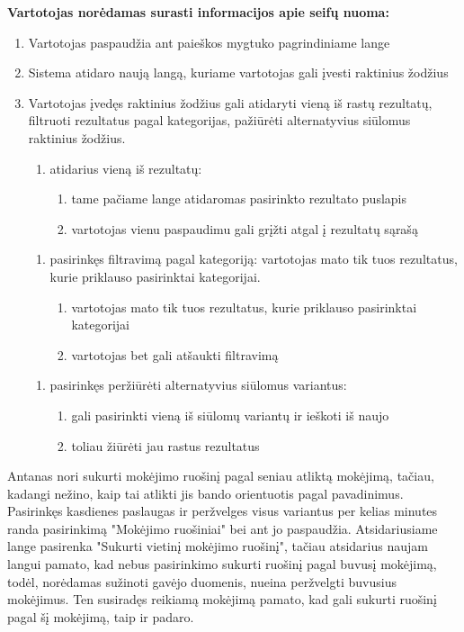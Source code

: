 \documentclass{VUMIFPSkursinis}
\begin{document}
\begin{center}
	\textbf{Vartotojas norėdamas surasti informacijos apie seifų nuoma:}
\end{center}
\begin{enumerate}
	\item Vartotojas paspaudžia ant paieškos mygtuko pagrindiniame lange
	\item Sistema atidaro naują langą, kuriame vartotojas gali įvesti raktinius žodžius
	\item Vartotojas įvedęs raktinius žodžius gali atidaryti vieną iš rastų rezultatų, filtruoti rezultatus pagal kategorijas, pažiūrėti alternatyvius siūlomus raktinius žodžius.
	\begin{enumerate}
		\item atidarius vieną iš rezultatų:
		\begin{enumerate}
			\item tame pačiame lange atidaromas pasirinkto rezultato puslapis
			\item vartotojas vienu paspaudimu gali grįžti atgal į rezultatų sąrašą
		\end{enumerate}
	\end{enumerate}
	\begin{enumerate}
		\item pasirinkęs filtravimą pagal kategoriją: vartotojas mato tik tuos rezultatus, kurie priklauso pasirinktai kategorijai.
		\begin{enumerate}
			\item vartotojas mato tik tuos rezultatus, kurie priklauso pasirinktai kategorijai
			\item vartotojas bet gali atšaukti filtravimą
		\end{enumerate}
	\end{enumerate}
	\begin{enumerate}
		\item pasirinkęs peržiūrėti alternatyvius siūlomus variantus:
		\begin{enumerate}
			\item gali pasirinkti vieną iš siūlomų variantų ir ieškoti iš naujo
			\item toliau žiūrėti jau rastus rezultatus
		\end{enumerate}
	\end{enumerate}
\end{enumerate}
Antanas nori sukurti mokėjimo ruošinį pagal seniau atliktą mokėjimą, tačiau, kadangi nežino, kaip tai atlikti jis bando orientuotis pagal pavadinimus. Pasirinkęs kasdienes paslaugas ir peržvelges visus variantus per kelias minutes randa pasirinkimą "Mokėjimo ruošiniai" bei ant jo paspaudžia. Atsidariusiame lange pasirenka "Sukurti vietinį mokėjimo ruošinį", tačiau atsidarius naujam langui pamato, kad nebus pasirinkimo sukurti ruošinį pagal buvusį mokėjimą, todėl, norėdamas sužinoti gavėjo duomenis, nueina peržvelgti buvusius mokėjimus. Ten susiradęs reikiamą mokėjimą pamato, kad gali sukurti ruošinį pagal šį mokėjimą, taip ir padaro.
\end{document}

